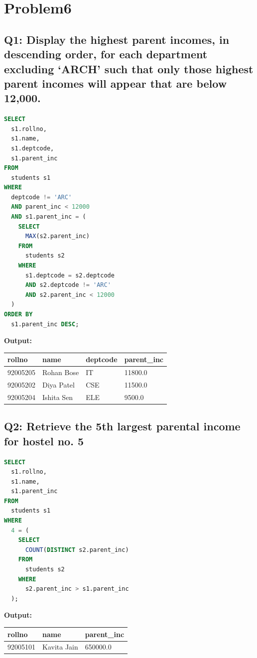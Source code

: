 \documentclass[11pt, a4paper]{article}
\begin{document}
\section{Problem6}
\subsection*{Q1: Display the highest parent incomes, in descending order, for each department excluding ‘ARCH’ such that only those highest parent incomes will appear that are below 12,000.}
\begin{lstlisting}[language=SQL]
SELECT
  s1.rollno,
  s1.name,
  s1.deptcode,
  s1.parent_inc
FROM
  students s1
WHERE
  deptcode != 'ARC'
  AND parent_inc < 12000
  AND s1.parent_inc = (
    SELECT
      MAX(s2.parent_inc)
    FROM
      students s2
    WHERE
      s1.deptcode = s2.deptcode
      AND s2.deptcode != 'ARC'
      AND s2.parent_inc < 12000
  )
ORDER BY
  s1.parent_inc DESC;
\end{lstlisting}
\vspace{0.3cm}
\textbf{Output:}\vspace{0.2cm}
\begin{center}
\begin{tabular}{|l|l|l|l|}
\hline
\textbf{rollno} & \textbf{name} & \textbf{deptcode} & \textbf{parent\_inc} \\ \hline
92005205 & Rohan Bose                     & IT  & 11800.0 \\ \hline
92005202 & Diya Patel                     & CSE & 11500.0 \\ \hline
92005204 & Ishita Sen                     & ELE & 9500.0 \\ \hline
\end{tabular}
\end{center}
\newpage
\subsection*{Q2: Retrieve the 5th largest parental income for hostel no. 5}
\begin{lstlisting}[language=SQL]
SELECT
  s1.rollno,
  s1.name,
  s1.parent_inc
FROM
  students s1
WHERE
  4 = (
    SELECT
      COUNT(DISTINCT s2.parent_inc)
    FROM
      students s2
    WHERE
      s2.parent_inc > s1.parent_inc
  );
\end{lstlisting}
\vspace{0.3cm}
\textbf{Output:}\vspace{0.2cm}
\begin{center}
\begin{tabular}{|l|l|l|}
\hline
\textbf{rollno} & \textbf{name} & \textbf{parent\_inc} \\ \hline
92005101 & Kavita Jain                    & 650000.0 \\ \hline
\end{tabular}
\end{center}
\newpage
\end{document}
